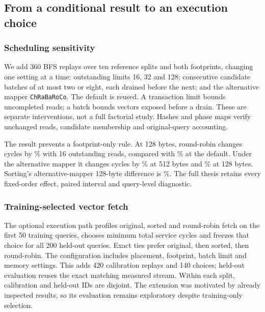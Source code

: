 \subsection{From a conditional result to an execution choice}
\subsubsection{Scheduling sensitivity}
We add 360 BFS replays over ten reference splits and both footprints, changing one setting at a time: outstanding limits 16, 32 and 128; consecutive candidate batches of at most two or eight, each drained before the next; and the alternative mapper \texttt{ChRaBaRoCo}. The default is reused. A transaction limit bounds uncompleted reads; a batch bounds vectors exposed before a drain. These are separate interventions, not a full factorial study. Hashes and phase maps verify unchanged reads, candidate membership and original-query accounting.

The result prevents a footprint-only rule. At 128 bytes, round-robin changes cycles by \SchedInflightSixteenRRCompact\% with 16 outstanding reads, compared with \SchedDefaultRRCompact\% at the default. Under the alternative mapper it changes cycles by \SchedAlternateMappingRRFloat\% at 512 bytes and \SchedAlternateMappingRRCompact\% at 128 bytes. Sorting's alternative-mapper 128-byte difference is \SchedAlternateMappingSortCompact\%. The full thesis retains every fixed-order effect, paired interval and query-level diagnostic.

\begin{table}[t]\centering\small
\caption{Training-selected BFS schedule versus matching original order. Mean cycle difference (\%) and paired 95\% interval over ten reference splits. Negative means fewer cycles. The 128-byte case is hypothetical repacking. All six sensitivity conditions are retained. Zeros denote selection of the original-order baseline.}\label{tab:profile-paper}

\end{table}

\subsubsection{Training-selected vector fetch}
The optional execution path profiles original, sorted and round-robin fetch on the first 50 training queries, chooses minimum total service cycles and freezes that choice for all 200 held-out queries. Exact ties prefer original, then sorted, then round-robin. The configuration includes placement, footprint, batch limit and memory settings. This adds 420 calibration replays and 140 choices; held-out evaluation reuses the exact matching measured stream. Within each split, calibration and held-out IDs are disjoint. The extension was motivated by already inspected results, so its evaluation remains exploratory despite training-only selection.



